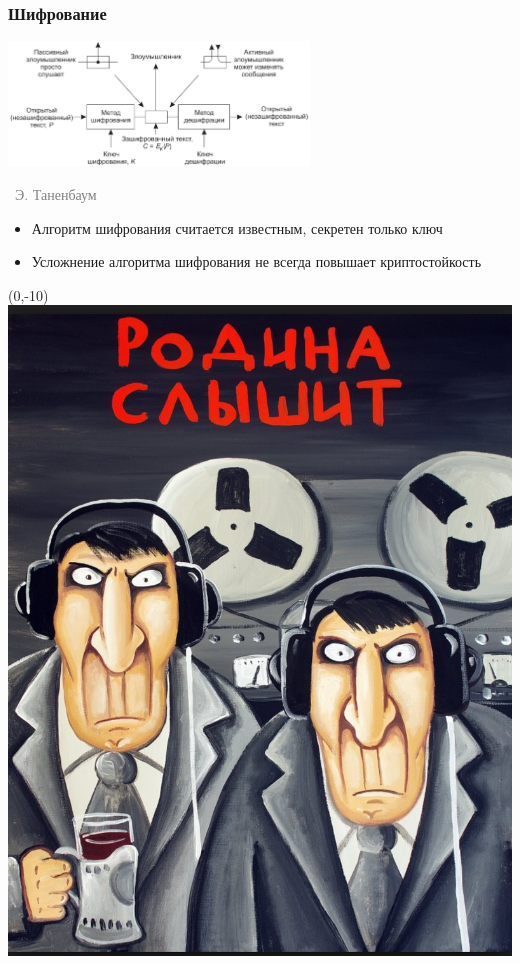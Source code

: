 \documentclass[xetex,mathserif,serif]{beamer}
\newcommand{\attribution}[1] {
\vspace{-5mm}\begin{flushright}\begin{scriptsize}\textcolor{gray}{\textcopyright\, #1}\end{scriptsize}\end{flushright}
}
\begin{document}
	\begin{frame}
		\frametitle{Шифрование}
		\begin{center}
			\includegraphics[width=0.6\textwidth]{cryptography.png}
			\attribution{Э. Таненбаум}
		\end{center}
		\begin{itemize}
			\item Алгоритм шифрования считается известным, секретен только ключ
			\item Усложнение алгоритма шифрования не всегда повышает криптостойкость
		\end{itemize}
		\begin{textblock}{2.5}(0,-10)
			\includegraphics[width=\textwidth]{youAreBeingWatched.png}
		\end{textblock}
	\end{frame}
\end{document}
